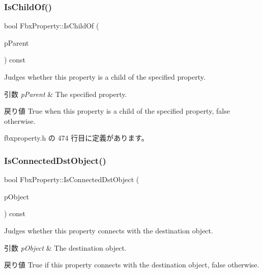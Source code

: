 \subsubsection{\texorpdfstring{Is\+Child\+Of()}{IsChildOf()}}
{\footnotesize\ttfamily bool Fbx\+Property\+::\+Is\+Child\+Of (\begin{DoxyParamCaption}\item[{const \hyperlink{class_fbx_property}{Fbx\+Property} \&}]{p\+Parent }\end{DoxyParamCaption}) const\hspace{0.3cm}{\ttfamily [inline]}}

Judges whether this property is a child of the specified property. 
\begin{DoxyParams}{引数}
{\em p\+Parent} & The specified property. \\
\hline
\end{DoxyParams}
\begin{DoxyReturn}{戻り値}
{\ttfamily True} when this property is a child of the specified property, {\ttfamily false} otherwise. 
\end{DoxyReturn}


 fbxproperty.\+h の 474 行目に定義があります。

\mbox{\label{class_fbx_property_a991b94a016bed8e93015e1024596bbef}} 
\subsubsection{\texorpdfstring{Is\+Connected\+Dst\+Object()}{IsConnectedDstObject()}}
{\footnotesize\ttfamily bool Fbx\+Property\+::\+Is\+Connected\+Dst\+Object (\begin{DoxyParamCaption}\item[{const \hyperlink{class_fbx_object}{Fbx\+Object} $\ast$}]{p\+Object }\end{DoxyParamCaption}) const}

Judges whether this property connects with the destination object. 
\begin{DoxyParams}{引数}
{\em p\+Object} & The destination object. \\
\hline
\end{DoxyParams}
\begin{DoxyReturn}{戻り値}
{\ttfamily True} if this property connects with the destination object, {\ttfamily false} otherwise. 
\end{DoxyReturn}
\mbox{\label{class_fbx_property_aff04371bd84802d5c50c397e5716b604}} 
